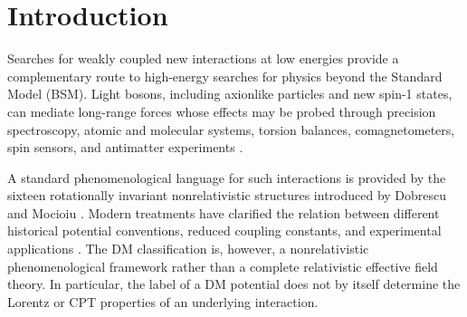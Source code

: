 \documentclass[aps,prd,reprint,superscriptaddress,nofootinbib]{revtex4-2}
\begin{document}
\begin{abstract}
		A compiled registry contains 283 constraint records, of which 247 are admitted to the present analysis. Twenty-two analysed records involve antimatter, and fifteen matter--antimatter pairs (thirteen independent) satisfy the adopted matching requirements in coupling convention, operator label, fermion
		sector, and interaction range. The resulting bound-based asymmetries
		span approximately $0.33$--$1$ in magnitude, but their size is not
		evidence for CPT violation. The present coverage is strongly
		matter-dominated, with substantial deficits in electron--nucleus,
		neutron--nucleus, and proton--nucleus sectors. We formulate a practical
		two-stage programme in which balanced sensitivity regions are first
		identified through a sensitivity-ratio function and genuine CPT
		tests are subsequently performed using signed observables or full
		likelihood functions.
		
	\end{abstract}
	
	\maketitle
	
	\section{Introduction}
	
	Searches for weakly coupled new interactions at low energies provide a
	complementary route to high-energy searches for physics beyond the
	Standard Model (BSM). Light bosons, including axionlike particles and
	new spin-1 states, can mediate long-range forces whose effects may be
	probed through precision spectroscopy, atomic and molecular systems,
	torsion balances, comagnetometers, spin sensors, and antimatter
	experiments \cite{MoodyWilczek1984,DobrescuMocioiu2006,
		Cong2025,WuYan2026}.
	
	A standard phenomenological language for such interactions is provided
	by the sixteen rotationally invariant nonrelativistic structures
	introduced by Dobrescu and Mocioiu \cite{DobrescuMocioiu2006}.
	Modern treatments have clarified the relation between different
	historical potential conventions, reduced coupling constants, and
	experimental applications \cite{Cong2025}. The DM classification is,
	however, a nonrelativistic phenomenological framework rather than a
	complete relativistic effective field theory. In particular, the label
	of a DM potential does not by itself determine the Lorentz or CPT
	properties of an underlying interaction.
	
\end{document}
